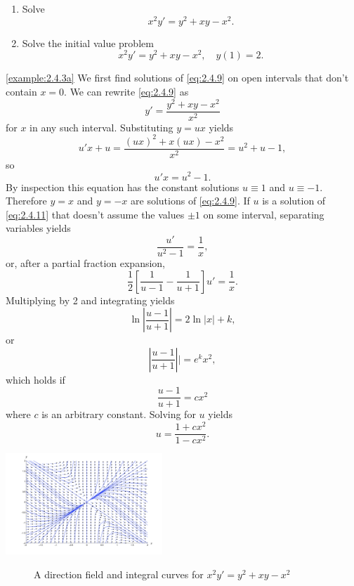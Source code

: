 \documentclass{ximera}
\begin{document}
\begin{example}\label{example:2.4.3}

\begin{enumerate}
\item\label{example:2.4.3a} %
Solve
\begin{equation} \label{eq:2.4.9}
x^2y'=y^2+xy-x^2.
\end{equation}

\item\label{example:2.4.3b} %
Solve the initial value problem
\begin{equation} \label{eq:2.4.10}
x^2y'=y^2+xy-x^2, \quad y(1)=2.
\end{equation}
\end{enumerate}

\begin{explanation}
\ref{example:2.4.3a} We first find solutions of \eqref{eq:2.4.9} on open intervals that don't
contain $x=0$. We can rewrite \eqref{eq:2.4.9} as
$$
y'=\frac{y^2+xy-x^2}{x^2}
$$
for $x$ in any such interval. Substituting $y=ux$ yields
$$
u'x+u =\frac{(ux)^2+x(ux)-x^2}{x^2}
= u^2+u-1,
$$
so
\begin{equation} \label{eq:2.4.11}
u'x=u^2-1.
\end{equation}
By inspection this equation has the constant solutions $u\equiv1$ and
$u\equiv-1$. Therefore $y=x$ and $y=-x$ are solutions of
\eqref{eq:2.4.9}. If $u$ is a solution of \eqref{eq:2.4.11} that doesn't
assume the values $\pm 1$ on some interval,  separating variables
yields
$$
\frac{u'}{u^2-1}=\frac{1}{x},
$$
 or, after a partial fraction expansion,
$$
{\frac{1}{2}}\left[\frac{1}{u-1}-\frac{1}{u+1}\right]u'=
\frac{1}{x}.
$$
 Multiplying by 2 and integrating yields
$$
\ln\left|\frac{u-1}{u+1}\right| =2 \ln |x|+k,
$$
 or
$$
\left|\frac{u-1}{u+1}\right||=e^kx^2,
$$
which holds if
\begin{equation} \label{eq:2.4.12}
\frac{u-1}{u+1}=cx^2
\end{equation}
where $c$ is an arbitrary constant.
  Solving for $u$ yields
$$
u =\frac{1+cx^2}{1-cx^2}.
$$
\begin{image}
\includegraphics[height=1.5in]{fig020403.jpg} 
\end{image}
\begin{center}
\begin{figure}
\caption{A direction field and  integral curves for
$x^{2}y'=y^{2}+xy-x^{2}$}
  \label{figure:2.4.3}
  \end{figure}
  \end{center}
  

\end{explanation}
\end{example}
\end{document}
